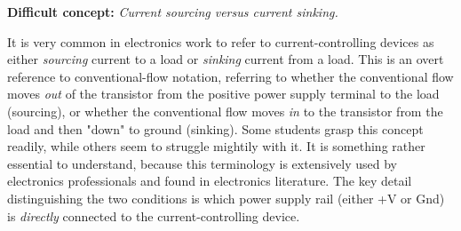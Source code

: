 \vskip 10pt

\noindent
{\bf Difficult concept: } {\it Current sourcing versus current sinking.}

It is very common in electronics work to refer to current-controlling devices as either {\it sourcing} current to a load or {\it sinking} current from a load.  This is an overt reference to conventional-flow notation, referring to whether the conventional flow moves {\it out} of the transistor from the positive power supply terminal to the load (sourcing), or whether the conventional flow moves {\it in} to the transistor from the load and then "down" to ground (sinking).  Some students grasp this concept readily, while others seem to struggle mightily with it.  It is something rather essential to understand, because this terminology is extensively used by electronics professionals and found in electronics literature.  The key detail distinguishing the two conditions is which power supply rail (either +V or Gnd) is {\it directly} connected to the current-controlling device.

